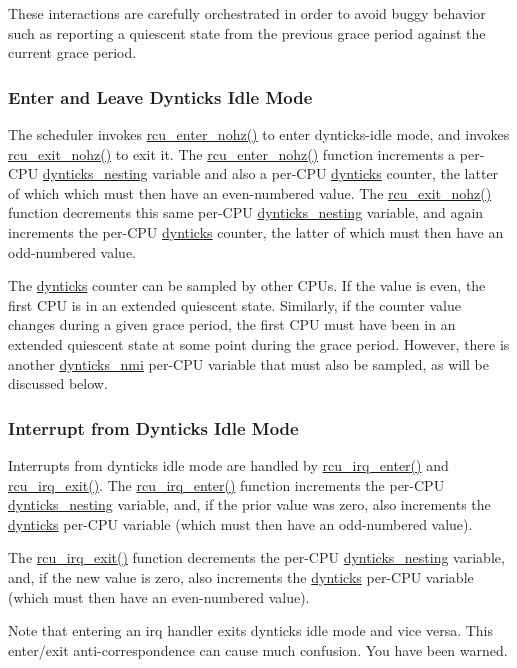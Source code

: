 These interactions are carefully orchestrated in order to avoid
buggy behavior such as reporting a quiescent state from the previous
grace period against the current grace period.

\subsubsection{Enter and Leave Dynticks Idle Mode}
\label{app:rcuimpl:rcutree:Enter and Leave Dynticks Idle Mode}

The scheduler invokes \url{rcu_enter_nohz()} to
enter dynticks-idle mode, and invokes \url{rcu_exit_nohz()}
to exit it.
The \url{rcu_enter_nohz()} function increments a per-CPU
\url{dynticks_nesting} variable and
also a per-CPU \url{dynticks} counter, the latter of which which must
then have an even-numbered value.
The \url{rcu_exit_nohz()} function decrements this same
per-CPU \url{dynticks_nesting} variable,
and again increments the per-CPU \url{dynticks}
counter, the latter of which must then have an odd-numbered value.

The \url{dynticks} counter can be sampled by other CPUs.
If the value is even, the first CPU is in an extended quiescent state.
Similarly, if the counter value changes during a given grace period,
the first CPU must have been in an extended quiescent state at some
point during the grace period.
However, there is another \url{dynticks_nmi} per-CPU variable
that must also be sampled, as will be discussed below.

\subsubsection{Interrupt from Dynticks Idle Mode}
\label{app:rcuimpl:rcutree:Interrupt from Dynticks Idle Mode}

Interrupts from dynticks idle mode are handled by
\url{rcu_irq_enter()} and \url{rcu_irq_exit()}.
The \url{rcu_irq_enter()} function increments the
per-CPU \url{dynticks_nesting} variable, and, if the prior
value was zero, also increments the \url{dynticks}
per-CPU variable (which must then have an odd-numbered value).

The \url{rcu_irq_exit()} function decrements the
per-CPU \url{dynticks_nesting} variable, and, if the new
value is zero, also increments the \url{dynticks}
per-CPU variable (which must then have an even-numbered value).

Note that entering an irq handler exits dynticks idle mode
and vice versa.
This enter/exit anti-correspondence can cause much confusion.
You have been warned.

